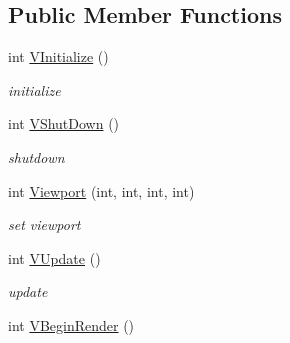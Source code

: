 \subsection*{Public Member Functions}
\begin{DoxyCompactItemize}
\item 
\hypertarget{classPlatform_1_1RenderGLX_a16434e71506df0322a8604062b457f43}{
int \hyperlink{classPlatform_1_1RenderGLX_a16434e71506df0322a8604062b457f43}{VInitialize} ()}
\label{classPlatform_1_1RenderGLX_a16434e71506df0322a8604062b457f43}

\begin{DoxyCompactList}\small\item\em initialize \item\end{DoxyCompactList}\item 
\hypertarget{classPlatform_1_1RenderGLX_a619ad202244f576ec7cd5cc7e92bfea3}{
int \hyperlink{classPlatform_1_1RenderGLX_a619ad202244f576ec7cd5cc7e92bfea3}{VShutDown} ()}
\label{classPlatform_1_1RenderGLX_a619ad202244f576ec7cd5cc7e92bfea3}

\begin{DoxyCompactList}\small\item\em shutdown \item\end{DoxyCompactList}\item 
\hypertarget{classPlatform_1_1RenderGLX_a3e59baa93edd22cd97f7ad4c31243f7b}{
int \hyperlink{classPlatform_1_1RenderGLX_a3e59baa93edd22cd97f7ad4c31243f7b}{Viewport} (int, int, int, int)}
\label{classPlatform_1_1RenderGLX_a3e59baa93edd22cd97f7ad4c31243f7b}

\begin{DoxyCompactList}\small\item\em set viewport \item\end{DoxyCompactList}\item 
\hypertarget{classPlatform_1_1RenderGLX_ad401b24b51f81996964d409eba3d2713}{
int \hyperlink{classPlatform_1_1RenderGLX_ad401b24b51f81996964d409eba3d2713}{VUpdate} ()}
\label{classPlatform_1_1RenderGLX_ad401b24b51f81996964d409eba3d2713}

\begin{DoxyCompactList}\small\item\em update \item\end{DoxyCompactList}\item 
\hypertarget{classPlatform_1_1RenderGLX_ad0ce197a4e90a29ae0f92de7fde9561b}{
int \hyperlink{classPlatform_1_1RenderGLX_ad0ce197a4e90a29ae0f92de7fde9561b}{VBeginRender} ()}
\label{classPlatform_1_1RenderGLX_ad0ce197a4e90a29ae0f92de7fde9561b}


\end{DoxyCompactItemize}
